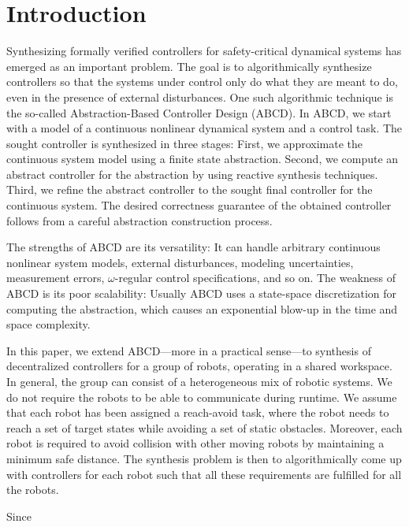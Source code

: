 
\section{Introduction}

Synthesizing formally verified controllers for safety-critical dynamical systems has emerged as an important problem.
The goal is to algorithmically synthesize controllers so that the systems under control only do what they are meant to do, even in the presence of external disturbances.
One such algorithmic technique is the so-called Abstraction-Based Controller Design (ABCD).
In ABCD, we start with a model of a continuous nonlinear dynamical system and a control task.
The sought controller is synthesized in three stages:
First, we approximate the continuous system model using a finite state abstraction.
Second, we compute an abstract controller for the abstraction by using reactive synthesis techniques.
Third, we refine the abstract controller to the sought final controller for the continuous system.
The desired correctness guarantee of the obtained controller follows from a careful abstraction construction process.

The strengths of ABCD are its versatility: 
It can handle arbitrary continuous nonlinear system models, external disturbances, modeling uncertainties, measurement errors, $\omega$-regular control specifications, and so on.
The weakness of ABCD is its poor scalability: 
Usually ABCD uses a state-space discretization for computing the abstraction, which causes an exponential blow-up in the time and space complexity.

In this paper, we extend ABCD---more in a practical sense---to synthesis of decentralized controllers for a group of robots, operating in a shared workspace.
In general, the group can consist of a heterogeneous mix of robotic systems.
We do not require the robots to be able to communicate during runtime.
We assume that each robot has been assigned a reach-avoid task, where the robot needs to reach a set of target states while avoiding a set of static obstacles.
Moreover, each robot is required to avoid collision with other moving robots by maintaining a minimum safe distance.
The synthesis problem is then to algorithmically come up with controllers for each robot such that all these requirements are fulfilled for all the robots.

Since 